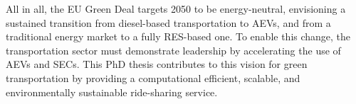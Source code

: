 All in all, the EU Green Deal targets 2050 to be energy-neutral, envisioning a sustained
transition from diesel-based transportation to AEVs, and from a traditional energy market to
a fully RES-based one. To enable this change, the transportation sector must demonstrate
leadership by accelerating the use of AEVs and SECs. This PhD thesis contributes to this vision for green transportation by providing a computational efficient, scalable, and environmentally sustainable ride-sharing service.




